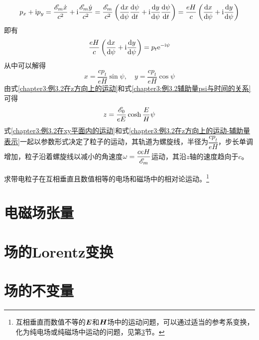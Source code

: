 \begin{solution}
\begin{equation*}
	p_x+\mathrm{i} p_y = \frac{\mathscr{E}_m\dot{x}}{c^2} + \mathrm{i} \frac{\mathscr{E}_m\dot{y}}{c^2} = \frac{\mathscr{E}_m}{c^2} \left(\frac{\mathrm{d} x}{\mathrm{d} \psi} \frac{\mathrm{d} \psi}{\mathrm{d} t} + \mathrm{i} \frac{\mathrm{d} y}{\mathrm{d} \psi} \frac{\mathrm{d} \psi}{\mathrm{d} t}\right) = \dfrac{eH}{c}\left(\frac{\mathrm{d} x}{\mathrm{d} \psi} + \mathrm{i} \frac{\mathrm{d} y}{\mathrm{d} \psi}\right)
\end{equation*}
即有
\begin{equation*}
	\dfrac{eH}{c}\left(\frac{\mathrm{d} x}{\mathrm{d} \psi} + \mathrm{i} \frac{\mathrm{d} y}{\mathrm{d} \psi}\right) = p_t\mathrm{e}^{-\mathrm{i} \psi}
\end{equation*}
从中可以解得
\begin{equation}
	x = \frac{cp_t}{eH}\sin \psi,\quad y = \frac{cp_t}{eH}\cos\psi
	\label{chapter3:例3.2在xy平面内的运动}
\end{equation}
由式\eqref{chapter3:例3.2在z方向上的运动}和式\eqref{chapter3:例3.2辅助量psi与时间的关系}可得
\begin{equation}
	z = \frac{\mathscr{E}_0}{eE}\cosh\frac{E}{H}\psi
	\label{chapter3:例3.2在z方向上的运动-辅助量表示}
\end{equation}
式\eqref{chapter3:例3.2在xy平面内的运动}和式\eqref{chapter3:例3.2在z方向上的运动-辅助量表示}一起以参数形式决定了粒子的运动，其轨道为螺旋线，半径为$\dfrac{cp_t}{eH}$，步长单调增加，粒子沿着螺旋线以减小的角速度$\omega = \dfrac{ceH}{\mathscr{E}_m}$运动，其沿$z$轴的速度趋向于$c$。
\end{solution}

\begin{example}
求带电粒子在互相垂直且数值相等的电场和磁场中的相对论运动。\footnote{互相垂直而数值不等的$\boldsymbol{E}$和$\boldsymbol{H}$场中的运动问题，可以通过适当的参考系变换，化为纯电场或纯磁场中运动的问题，见第\ref{chapter3:section:场的不变量}节。}
\end{example}

\section{电磁场张量}

\section{场的Lorentz变换}

\section{场的不变量}\label{chapter3:section:场的不变量}